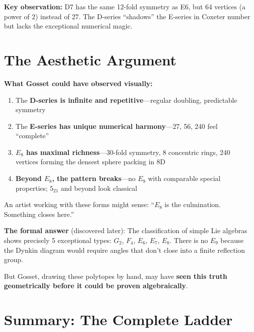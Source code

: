 \documentclass[11pt]{article}
\begin{document}
\textbf{Key observation:} D7 has the same 12-fold symmetry as E6, but 64 vertices (a power
of 2) instead of 27. The D-series ``shadows'' the E-series in Coxeter number but lacks
the exceptional numerical magic.

\section*{The Aesthetic Argument}

\textbf{What Gosset could have observed visually:}

\begin{enumerate}
\item The \textbf{D-series is infinite and repetitive}---regular doubling, predictable symmetry
\item The \textbf{E-series has unique numerical harmony}---27, 56, 240 feel ``complete''
\item \textbf{$E_8$ has maximal richness}---30-fold symmetry, 8 concentric rings,
240 vertices forming the densest sphere packing in 8D
\item \textbf{Beyond $E_8$, the pattern breaks}---no $E_9$ with comparable special properties;
$5_{21}$ and beyond look classical
\end{enumerate}

An artist working with these forms might sense: ``$E_8$ is the culmination.
Something closes here.''

\vspace{1em}

\textbf{The formal answer} (discovered later): The classification of simple Lie
algebras shows precisely 5 exceptional types: $G_2$, $F_4$, $E_6$, $E_7$, $E_8$.
There is no $E_9$ because the Dynkin diagram would require angles that don't close
into a finite reflection group.

But Gosset, drawing these polytopes by hand, may have \textbf{seen this truth
geometrically before it could be proven algebraically}.

\section*{Summary: The Complete Ladder}
\end{document}
